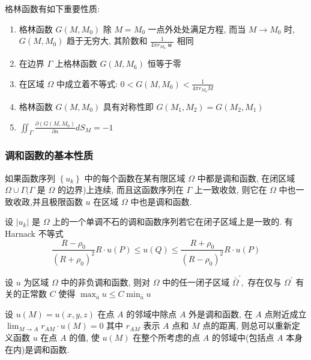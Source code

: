 \documentclass[10pt]{yerbaformat}
\begin{document}
\par 格林函数有如下重要性质:
\begin{enumerate}
    \item 格林函数 $G\left(M, M_{0}\right)$ 除 $M=M_{0}$ 一点外处处满足方程, 而当 $M \rightarrow M_{0}$ 时, $G\left(M, M_{0}\right)$ 趋于无穷大, 其阶数和 $\frac{1}{4 \pi r_{M_{0}} \text { м }}$ 相同
    \item 在边界 $\Gamma$ 上格林函数 $G\left(M, M_{6}\right)$ 恒等于零
    \item 在区域 $\Omega$ 中成立着不等式: $ 0<G\left(M, M_{0}\right)<\frac{1}{4 \pi r_{M_{0}} M}$
    \item 格林函数 $G\left(M, M_{0}\right)$ 具有对称性即 $ G\left(M_{1}, M_{2}\right)=G\left(M_{2}, M_{1}\right)$
    \item $\iint_{\Gamma} \frac{\partial\left(G\left(M, M_{0}\right)\right.}{\partial n} d S_{M}=-1$
\end{enumerate}

\subsubsection{调和函数的基本性质}

\begin{theorem}
      如果函数序列 $\left\{u_{k}\right\}$ 中的每个函数在某有限区域 $\Omega$ 中都是调和函数, 在闭区域 $\Omega \cup \Gamma(\Gamma$ 是 $\Omega$ 的边界)上连续, 而且这函数序列在 $\Gamma$ 上一致收敛, 则它在 $\Omega$ 中也一致收政,并且极限函数 $u$ 在区域 $\Omega$ 中也是调和函数.
\end{theorem}

\begin{theorem}
    设 $\left|u_{k}\right|$ 是 $\Omega$ 上的一个单调不石的调和函数序列若它在闭子区域上是一致的. 有 Harnack 不等式 $$\frac{R-\rho_{0}}{\left(R+\rho_{0}\right)^{2}} R \cdot u(P) \leqslant u(Q) \leqslant \frac{R+\rho_{0}}{\left(R-\rho_{0}\right)^{2}} R \cdot u(P)$$
\end{theorem}

\begin{theorem}
    设 $u$ 为区域 $\Omega$ 中的非负调和函数, 则对 $\Omega$ 中的任一闭子区域 $\bar{\Omega}^{\prime},$ 存在仅与 $\Omega^{\prime}$ 有关的正常数 $C$ 使得 $\max _{\bar{a}} u \leqslant C \min _{\bar{a}} u$
\end{theorem}

\begin{theorem}[可去奇点定理]
    设 $u(M)=u(x, y, z)$ 在点 $A$ 的邻域中除点 $A$ 外是调和函数, 在 $A$ 点附近成立 $\lim _{M \rightarrow A} r_{A M} \cdot u(M)=0$ 其中 $r_{A M}$ 表示 $A$ 点和 $M$ 点的距离, 则总可以重新定义函数 $u$ 在点 $A$ 的值, 使 $u(M)$ 在整个所考虑的点 $A$ 的邻域中(包括点 $A$ 本身在内)是调和函数.
\end{theorem}
\end{document}
